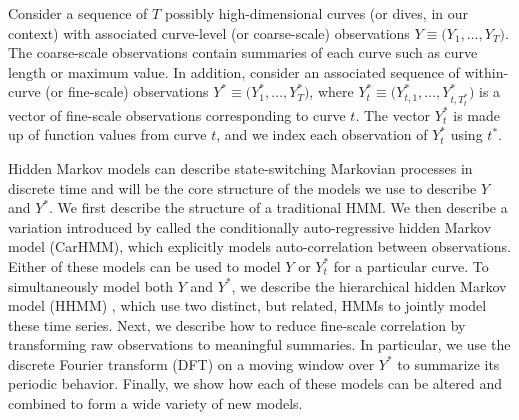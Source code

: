 
Consider a sequence of $T$ possibly high-dimensional curves (or dives, in our context) with associated curve-level (or coarse-scale) observations $Y \equiv \Big(Y_1, \ldots, Y_T\Big)$. The coarse-scale observations contain summaries of each curve such as curve length or maximum value. In addition, consider an associated sequence of within-curve (or fine-scale) observations $Y^* \equiv \Big(Y^*_1,\ldots,Y^*_T \Big)$, where $Y^*_{t} \equiv \Big(Y^*_{t,1},\ldots,Y^*_{t,T^*_t}\Big)$ is a vector of fine-scale observations corresponding to curve $t$. The vector $Y^*_{t}$ is made up of function values from curve $t$, and we index each observation of $Y^*_t$ using $t^*$. 

Hidden Markov models can describe state-switching Markovian processes in discrete time and will be the core structure of the models we use to describe $Y$ and $Y^*$. %
We first describe the structure of a traditional HMM. We then describe a variation introduced by \cite{Lawler:2019} called the conditionally auto-regressive hidden Markov model (CarHMM), which explicitly models auto-correlation between observations. Either of these models can be used to model $Y$ or $Y^*_t$ for a particular curve. To simultaneously model both $Y$ and $Y^*$, we describe the hierarchical hidden Markov model (HHMM) \citep{Barajas:2017,Adam:2019}, which use two distinct, but related, HMMs to jointly model these time series. Next, we describe how to reduce fine-scale correlation by transforming raw observations to meaningful summaries. In particular, we use the discrete Fourier transform (DFT) on a moving window over $Y^*$ to summarize its periodic behavior. Finally, we show how each of these models can be altered and combined to form a wide variety of new models.

